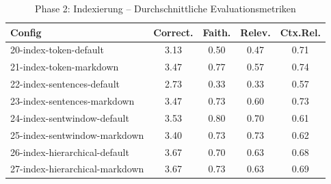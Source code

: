 \begin{table}[H]
\centering
\small
\begin{tabular}{lcccc}
\toprule
Config & Correct. & Faith. & Relev. & Ctx.Rel. \\
\midrule
20-index-token-default & 3.13 & 0.50 & 0.47 & 0.71 \\
21-index-token-markdown & 3.47 & 0.77 & 0.57 & 0.74 \\
22-index-sentences-default & 2.73 & 0.33 & 0.33 & 0.57 \\
23-index-sentences-markdown & 3.47 & 0.73 & 0.60 & 0.73 \\
24-index-sentwindow-default & 3.53 & 0.80 & 0.70 & 0.61 \\
25-index-sentwindow-markdown & 3.40 & 0.73 & 0.73 & 0.62 \\
26-index-hierarchical-default & 3.67 & 0.70 & 0.63 & 0.68 \\
27-index-hierarchical-markdown & 3.67 & 0.73 & 0.63 & 0.69 \\
\bottomrule
\end{tabular}
\caption{Phase 2: Indexierung -- Durchschnittliche Evaluationsmetriken}
\label{tab:phase2_eval}
\end{table}